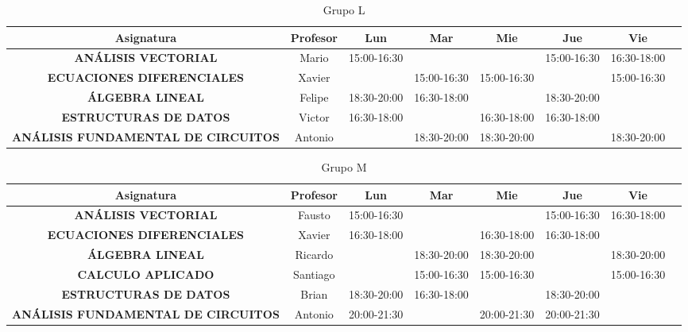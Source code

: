 \documentclass[10pt,letterpaper,twoside,openright]{article}
\begin{document}
	\begin{table}[h!]
		\centering
		\begin{adjustbox}{max width=\textwidth}
		\begin{tabular}{c||ccccccc}
		\textbf{Asignatura}                        & \textbf{Profesor} & \textbf{Lun} & \textbf{Mar} & \textbf{Mie} & \textbf{Jue} & \textbf{Vie} \\ \hline \hline
		\textbf{ANÁLISIS VECTORIAL}                & Mario    & 15:00-16:30 &             &             & 15:00-16:30 & 16:30-18:00 \\
		\textbf{ECUACIONES DIFERENCIALES}          & Xavier   &             & 15:00-16:30 & 15:00-16:30 &             & 15:00-16:30 \\
		\textbf{ÁLGEBRA LINEAL}                    & Felipe   & 18:30-20:00 & 16:30-18:00 &             & 18:30-20:00 &             \\
		\textbf{ESTRUCTURAS DE DATOS}              & Victor   & 16:30-18:00 &             & 16:30-18:00 & 16:30-18:00 &             \\
		\textbf{ANÁLISIS FUNDAMENTAL DE CIRCUITOS} & Antonio  &             & 18:30-20:00 & 18:30-20:00 &             & 18:30-20:00
		\end{tabular}
		\end{adjustbox}
		\caption{Grupo L}
		\label{tab:grupo_l}
	\end{table}

	\begin{table}[h!]
		\centering
		\begin{adjustbox}{max width=\textwidth}
		\begin{tabular}{c||ccccccc}
		\textbf{Asignatura}                        & \textbf{Profesor} & \textbf{Lun} & \textbf{Mar} & \textbf{Mie} & \textbf{Jue} & \textbf{Vie} \\ \hline \hline
		\textbf{ANÁLISIS VECTORIAL}                & Fausto   & 15:00-16:30 &             &             & 15:00-16:30 & 16:30-18:00 \\
		\textbf{ECUACIONES DIFERENCIALES}          & Xavier   & 16:30-18:00 &             & 16:30-18:00 & 16:30-18:00 &             \\
		\textbf{ÁLGEBRA LINEAL}                    & Ricardo  &             & 18:30-20:00 & 18:30-20:00 &             & 18:30-20:00 \\
		\textbf{CALCULO APLICADO}                  & Santiago &             & 15:00-16:30 & 15:00-16:30 &             & 15:00-16:30 \\
		\textbf{ESTRUCTURAS DE DATOS}              & Brian    & 18:30-20:00 & 16:30-18:00 &             & 18:30-20:00 &             \\
		\textbf{ANÁLISIS FUNDAMENTAL DE CIRCUITOS} & Antonio  & 20:00-21:30 &             & 20:00-21:30 & 20:00-21:30 &            
		\end{tabular}
		\end{adjustbox}
		\caption{Grupo M}
		\label{tab:grupo_m}
	\end{table}
\end{document}
